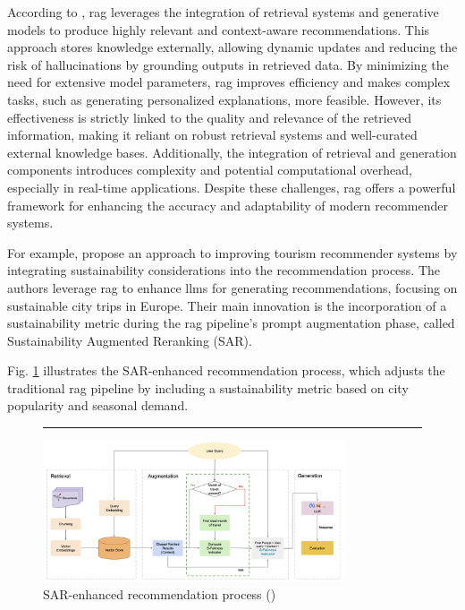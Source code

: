 According to \cite{Deldjoo2024}, \gls{rag} leverages the integration of retrieval systems and generative models to produce highly relevant and context-aware recommendations.
This approach stores knowledge externally, allowing dynamic updates and reducing the risk of hallucinations by grounding outputs in retrieved data.
By minimizing the need for extensive model parameters, \gls{rag} improves efficiency and makes complex tasks, such as generating personalized explanations, more feasible.
However, its effectiveness is strictly linked to the quality and relevance of the retrieved information, making it reliant on robust retrieval systems and well-curated external knowledge bases.
Additionally, the integration of retrieval and generation components introduces complexity and potential computational overhead, especially in real-time applications.
Despite these challenges, \gls{rag} offers a powerful framework for enhancing the accuracy and adaptability of modern recommender systems.

For example, \cite{Banerjee2024} propose an approach to improving tourism recommender systems by integrating sustainability considerations into the recommendation process.
The authors leverage \gls{rag} to enhance \glspl{llm} for generating recommendations, focusing on sustainable city trips in Europe.
Their main innovation is the incorporation of a sustainability metric during the \gls{rag} pipeline's prompt augmentation phase, called Sustainability Augmented Reranking (SAR).

Fig. \ref{fig:sar-enhanced-recommendation} illustrates the SAR-enhanced recommendation process, which adjusts the traditional \gls{rag} pipeline by including a sustainability metric based on city popularity and seasonal demand.

\begin{figure}[htbp]
    \centering
    \rule{35em}{0.5pt}
    \includegraphics[width=0.8\textwidth]{03_Figures/literature-review/rag-tourism.png}
    \caption{SAR-enhanced recommendation process (\cite{Banerjee2024})}
 \label{fig:sar-enhanced-recommendation}
\end{figure}

